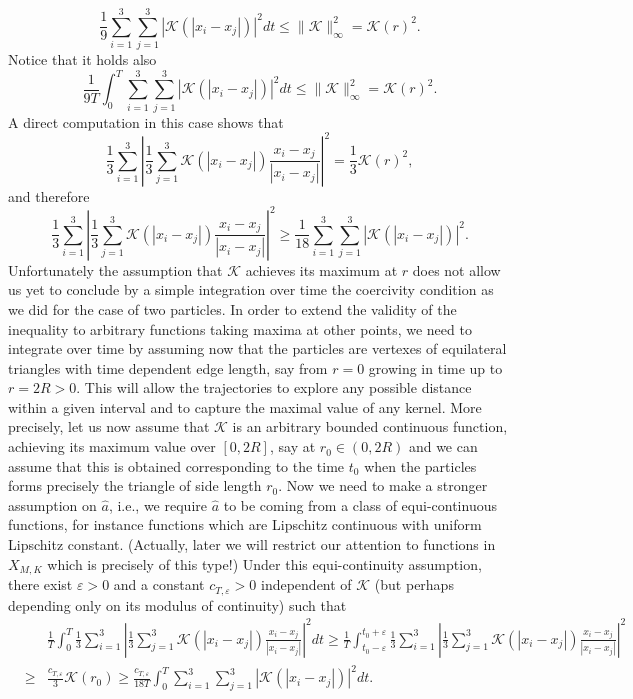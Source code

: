 $$
\frac{1}{9}   \sum_{i=1}^3 \sum_{j=1}^3 |\mathcal K(|x_i-x_j|)|^2  dt \leq \|\mathcal K\|_\infty^2 = \mathcal K(r)^2.
$$
Notice that it holds also
\begin{equation}\label{maxbound}
\frac{1}{9 T} \int_0^T  \sum_{i=1}^3 \sum_{j=1}^3 |\mathcal K(|x_i-x_j|)|^2  dt \leq \|\mathcal K\|_\infty^2 = \mathcal K(r)^2.
\end{equation}
A direct computation in this case shows that 
$$
 \frac{1}{3} \sum_{i=1}^3 \left | \frac{1}{3} \sum_{j=1}^3 \mathcal K(|x_i-x_j|) \frac{x_i-x_j}{|x_i-x_j|} \right |^2 =\frac{1}{3}  \mathcal K(r)^2,
$$
and therefore
$$ 
\frac{1}{3} \sum_{i=1}^3 \left | \frac{1}{3} \sum_{j=1}^3 \mathcal K(|x_i-x_j|) \frac{x_i-x_j}{|x_i-x_j|} \right |^2 \geq \frac{1}{18}   \sum_{i=1}^3 \sum_{j=1}^3 |\mathcal K(|x_i-x_j|)|^2.
$$
Unfortunately the assumption that $\mathcal K$ achieves its maximum at $r$ does not  allow us yet to conclude by a simple integration over time the coercivity condition as we did for the case of two particles. In order to extend the validity of the inequality to arbitrary functions taking maxima at other points, we need to integrate over time by assuming now that the particles are vertexes of equilateral triangles with time dependent edge length, say from $r=0$ growing in time up to $r=2 R>0$. This will allow the trajectories to explore any possible distance within a given interval and to capture the maximal value of  any kernel. More precisely, let us now assume that $\mathcal K$ is an arbitrary bounded continuous function,  achieving its maximum value over $[0,2R]$, say at $r_0 \in (0,2R)$ and we can assume that this is obtained corresponding to the time $t_0$ when the particles forms precisely the triangle of side length $r_0$. Now we need to make a stronger assumption on $\widehat a$, i.e., we require $\widehat a$ to be coming from a class of equi-continuous functions, for instance functions which are Lipschitz continuous with uniform Lipschitz constant. (Actually, later we will restrict our attention  to functions in $X_{M,K}$ which is precisely of this type!)
Under this equi-continuity assumption, there exist $\varepsilon>0$ and a constant $c_{T,\varepsilon}>0$ independent of $\mathcal K$ (but perhaps depending only on its modulus of continuity) such that
\begin{eqnarray*}\label{coercint}
&&\frac{1}{T} \int_0^T \frac{1}{3} \sum_{i=1}^3 \left | \frac{1}{3} \sum_{j=1}^3 \mathcal K(|x_i-x_j|) \frac{x_i-x_j}{|x_i-x_j|} \right |^2 dt \geq \frac{1}{T} \int_{t_0 - \varepsilon}^{t_0+\varepsilon} \frac{1}{3} \sum_{i=1}^3 \left | \frac{1}{3} \sum_{j=1}^3 \mathcal K(|x_i-x_j|) \frac{x_i-x_j}{|x_i-x_j|} \right |^2 \\
&\geq & \frac{c_{T,\varepsilon}}{3}  \mathcal K(r_0) \geq \frac{c_{T,\varepsilon}}{18T } \int_0^T  \sum_{i=1}^3 \sum_{j=1}^3 |\mathcal K(|x_i-x_j|)|^2  dt.
\end{eqnarray*}
